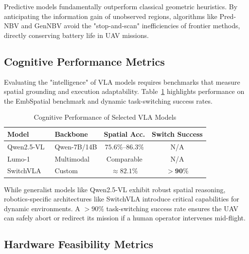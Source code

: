 \documentclass[conference]{IEEEtran}
\begin{document}
Predictive models fundamentally outperform classical geometric heuristics. By anticipating the information gain of unobserved regions, algorithms like Pred-NBV and GenNBV avoid the "stop-and-scan" inefficiencies of frontier methods, directly conserving battery life in UAV missions.

\subsection{Cognitive Performance Metrics}
\label{subsec:cognitive_metrics}

Evaluating the "intelligence" of VLA models requires benchmarks that measure spatial grounding and execution adaptability. Table~\ref{tab:vla_cognitive} highlights performance on the EmbSpatial benchmark and dynamic task-switching success rates.

\begin{table}[htbp]
	\caption{Cognitive Performance of Selected VLA Models}
	\label{tab:vla_cognitive}
	\begin{center}
		\begin{tabular}{llcc}
			\toprule
			\textbf{Model} & \textbf{Backbone} & \textbf{Spatial Acc.} & \textbf{Switch Success} \\
			\midrule
			Qwen2.5-VL~\cite{bai2025qwen25vltechnicalreport} & Qwen-7B/14B & $75.6\%$--$86.3\%$ & N/A \\
			Lumo-1~\cite{astribot2025lumo}   & Multimodal  & Comparable & N/A \\
			SwitchVLA~\cite{li2025switchvla} & Custom      & $\approx 82.1\%$ & $\mathbf{> 90\%}$ \\
			\bottomrule
		\end{tabular}
	\end{center}
\end{table}

While generalist models like Qwen2.5-VL exhibit robust spatial reasoning, robotics-specific architectures like SwitchVLA introduce critical capabilities for dynamic environments. A $>90\%$ task-switching success rate ensures the UAV can safely abort or redirect its mission if a human operator intervenes mid-flight.

\subsection{Hardware Feasibility Metrics}
\label{subsec:hardware_metrics}
\end{document}
